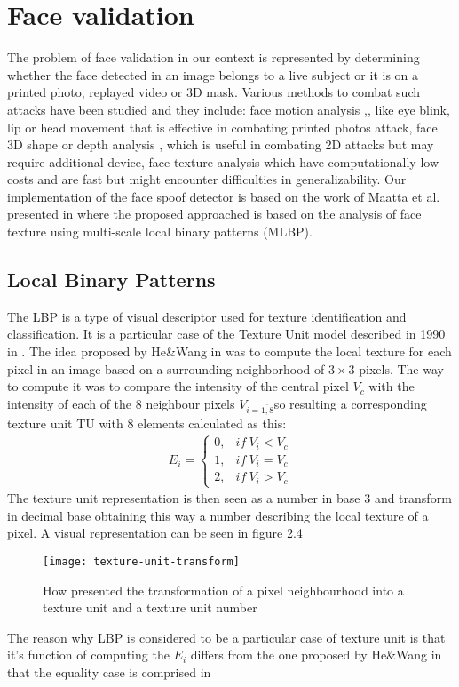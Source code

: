 \section{Face validation}
The problem of face validation in our context is represented by determining whether the face detected in an image belongs to a live subject or it is on a printed photo, replayed video or 3D mask. Various methods to combat such attacks have been studied and they include: face motion analysis \cite{BharadwajDVS13},\cite{PanSWL07},\cite{TirunagariPWISH15} like eye blink, lip or head movement that is effective in combating printed photos attack, face 3D shape or depth analysis \cite{MarsicoNRD12}, \cite{LagorioTCFS13} which is useful in combating 2D attacks but may require additional device, face texture analysis \cite{MaattaHP11} which have computationally low costs and are fast but might encounter difficulties in generalizability. Our implementation of the face spoof detector is based on the work of Maatta et al. presented in \cite{MaattaHP11} where the proposed approached is based on the analysis of face texture using multi-scale local binary patterns (MLBP).
\subsection{Local Binary Patterns}
The LBP is a type of visual descriptor used for texture identification and classification. It is a particular case of the Texture Unit model described in 1990 in \cite{HeWang90}. The idea proposed by He\&Wang in \cite{HeWang90} was to compute the local texture for each pixel in an image based on a surrounding neighborhood of $3\times3$ pixels. The way to compute it was to compare the intensity of the central pixel $V_c$ with the intensity of each of the 8 neighbour pixels $V_{i=\overline{1,8}}$so resulting a corresponding texture unit TU with 8 elements calculated as this:
\begin{align}
	E_i = \begin{cases}
	0, & if\ V_i < V_c \\
	1, & if\ V_i = V_c \\
	2, & if\ V_i > V_c
	\end{cases}
\end{align}
The texture unit representation is then seen as a number in base 3 and transform in decimal base obtaining this way a number describing the local texture of a pixel.
A visual representation can be seen in figure 2.4
\begin{figure}[h]
	\begin{center}
		\texttt{[image: texture-unit-transform]}
	\end{center}
	\caption[Visual representation of texture unit transform]{How \cite{HeWang90} presented the transformation of a pixel neighbourhood into a texture unit and a texture unit number}
\end{figure}

The reason why LBP is considered to be a particular case of texture unit is that it's function of computing the $E_i$ differs from the one proposed by He\&Wang in that the equality case is comprised in 
